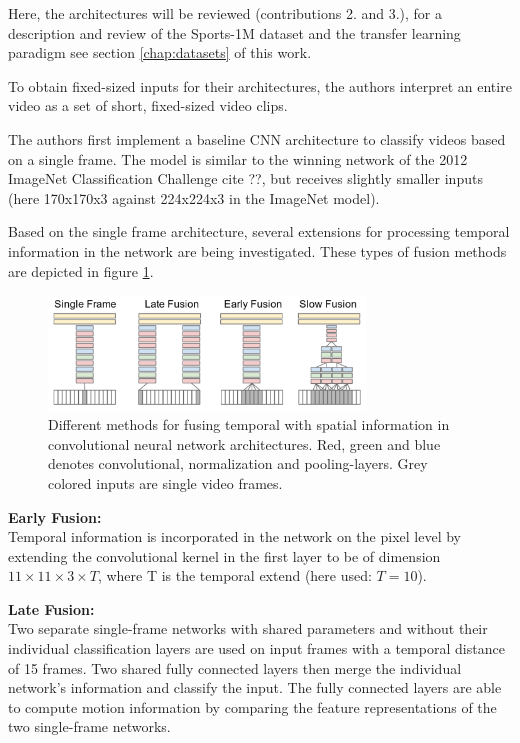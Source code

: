 Here, the architectures will be reviewed (contributions 2. and 3.), for a description and review of the Sports-1M dataset and the transfer learning paradigm see section \ref{chap:datasets} of this work.

To obtain fixed-sized inputs for their architectures, the authors interpret an entire video as a set of short, fixed-sized video clips.

The authors first implement a baseline CNN architecture to classify videos based on a single frame.
The model is similar to the winning network of the 2012 ImageNet Classification Challenge cite ??, but receives slightly smaller inputs (here 170x170x3 against 224x224x3 in the ImageNet model).

Based on the single frame architecture, several extensions for processing temporal information in the network are being investigated. These types of fusion methods are depicted in figure \ref{fig:largescale_fusionmethods}.

\begin{figure}[H]
    \centering
    \includegraphics[width=0.75\textwidth]{img_deep/largescale_fusionmethods}
    \caption{Different methods for fusing temporal with spatial information in convolutional neural network architectures. Red, green and blue denotes convolutional, normalization and pooling-layers. Grey colored inputs are single video frames. \cite{karpathy_large-scale_2014}}
    \label{fig:largescale_fusionmethods}
\end{figure}

\textbf{Early Fusion:} \\
Temporal information is incorporated in the network on the pixel level by extending the convolutional kernel in the first layer to be of dimension $11 \times 11 \times 3 \times T$, where T is the temporal extend (here used: $T = 10$).

\textbf{Late Fusion:} \\
Two separate single-frame networks with shared parameters and without their individual classification layers are used on input frames with a temporal distance of 15 frames.
Two shared fully connected layers then merge the individual network's information and classify the input. 
The fully connected layers are able to compute motion information by comparing the feature representations of the two single-frame networks.

